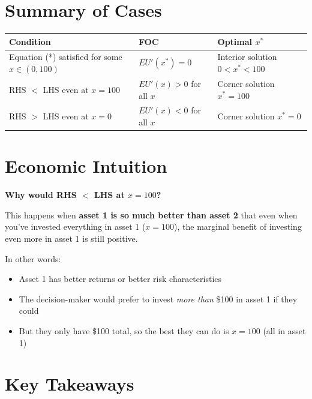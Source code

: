 \documentclass[12pt]{article}
\begin{document}
\newpage

\section*{Summary of Cases}

\begin{center}
\begin{tabular}{|l|l|l|}
\hline
\textbf{Condition} & \textbf{FOC} & \textbf{Optimal $x^*$} \\
\hline
\makecell[l]{Equation (*) satisfied \\ for some $x \in (0, 100)$} & $EU'(x^*) = 0$ & \makecell[l]{Interior solution \\ $0 < x^* < 100$} \\
\hline
\makecell[l]{RHS $<$ LHS \\ even at $x = 100$} & $EU'(x) > 0$ for all $x$ & \makecell[l]{Corner solution \\ $x^* = 100$} \\
\hline
\makecell[l]{RHS $>$ LHS \\ even at $x = 0$} & $EU'(x) < 0$ for all $x$ & \makecell[l]{Corner solution \\ $x^* = 0$} \\
\hline
\end{tabular}
\end{center}

\section*{Economic Intuition}

\textbf{Why would RHS $<$ LHS at $x = 100$?}

This happens when \textbf{asset 1 is so much better than asset 2} that even when you've invested everything in asset 1 ($x = 100$), the marginal benefit of investing even more in asset 1 is still positive.

In other words:
\begin{itemize}
    \item Asset 1 has better returns or better risk characteristics
    \item The decision-maker would prefer to invest \textit{more than} \$100 in asset 1 if they could
    \item But they only have \$100 total, so the best they can do is $x = 100$ (all in asset 1)
\end{itemize}

\section*{Key Takeaways}
\end{document}
